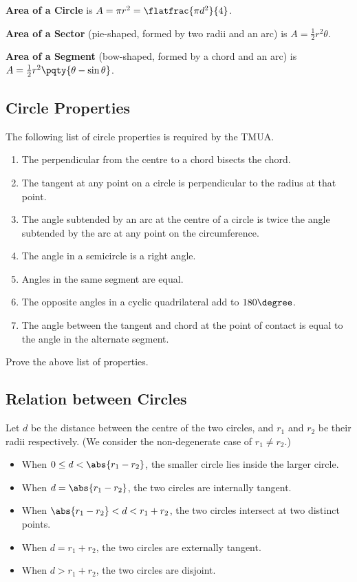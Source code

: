 \documentclass{article}
\begin{document}
\textbf{Area of a Circle} is \(A = \pi r^2 = \flatfrac{\pi d^2}{4}\).

\textbf{Area of a Sector} (pie-shaped, formed by two radii and an arc) is \(A = \frac{1}{2} r^2 \theta\).

\textbf{Area of a Segment} (bow-shaped, formed by a chord and an arc) is \(A = \frac{1}{2} r^2 \pqty{\theta - \sin \theta}\).

\subsection{Circle Properties}

The following list of circle properties is required by the TMUA.

\begin{enumerate}
    \item The perpendicular from the centre to a chord bisects the chord.
    \item The tangent at any point on a circle is perpendicular to the radius at that point.
    \item The angle subtended by an arc at the centre of a circle is twice the angle subtended by the arc at any point on the circumference.
    \item The angle in a semicircle is a right angle.
    \item Angles in the same segment are equal.
    \item The opposite angles in a cyclic quadrilateral add to \(180 \degree\).
    \item The angle between the tangent and chord at the point of contact is equal to the angle in the alternate segment.
\end{enumerate}

\begin{problem}
    Prove the above list of properties.
\end{problem}

\subsection{Relation between Circles}

Let \(d\) be the distance between the centre of the two circles, and \(r_1\) and \(r_2\) be their radii respectively. (We consider the non-degenerate case of \(r_1 \neq r_2\).)

\begin{itemize}
    \item When \(0 \leq d < \abs{r_1 - r_2}\), the smaller circle lies inside the larger circle.
    \item When \(d = \abs{r_1 - r_2}\), the two circles are internally tangent.
    \item When \(\abs{r_1 - r_2} < d < r_1 + r_2\), the two circles intersect at two distinct points.
    \item When \(d = r_1 + r_2\), the two circles are externally tangent.
    \item When \(d > r_1 + r_2\), the two circles are disjoint.
\end{itemize}
\end{document}
